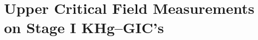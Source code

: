 \setcounter{chapter}{3}
\chapter{Upper Critical Field Measure\-ments on Stage I KHg--GIC's}
\pagestyle{headings}
\label{critf}






